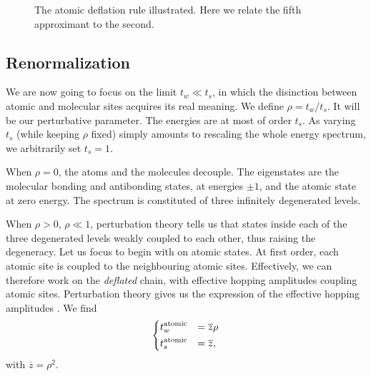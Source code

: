 \documentclass[11pt]{article}
\newcommand{\zb}{\ensuremath{\overline{z}}}
\begin{document}
\begin{figure}[htp]
	\centering
	
	\caption{The atomic deflation rule illustrated. Here we relate the fifth approximant to the second.}
\label{fig:at_defl}
\end{figure}

\subsection{Renormalization}

We are now going to focus on the limit $t_w \ll t_s$, in which the disinction between atomic and molecular sites acquires its real meaning.
We define $\rho = t_w/t_s$. It will be our perturbative parameter.
The energies are at most of order $t_s$. As varying $t_s$ (while keeping $\rho$ fixed) simply amounts to rescaling the whole energy spectrum, we arbitrarily set $t_s = 1$. 

When $\rho = 0$, the atoms and the molecules decouple. The eigenstates are the molecular bonding and antibonding states, at energies $\pm 1$, and the atomic state at zero energy.
The spectrum is constituted of three infinitely degenerated levels.

When $\rho > 0$, $\rho \ll 1$, perturbation theory tells us that states inside each of the three degenerated levels weakly coupled to each other, thus raising the degeneracy.
Let us focus to begin with on atomic states. At first order, each atomic site is coupled to the neighbouring atomic sites.
Effectively, we can therefore work on the \emph{deflated} chain, with effective hopping amplitudes coupling atomic sites. Perturbation theory gives us the expression of the effective hopping amplitudes \cite{Niu1990}.
We find
\begin{equation}
	\begin{dcases}
	t^\text{atomic}_w &= \zb \rho\\
	t^\text{atomic}_s &= \zb,
	\end{dcases}
\end{equation}
with $\zb =\rho^2$.
\end{document}
